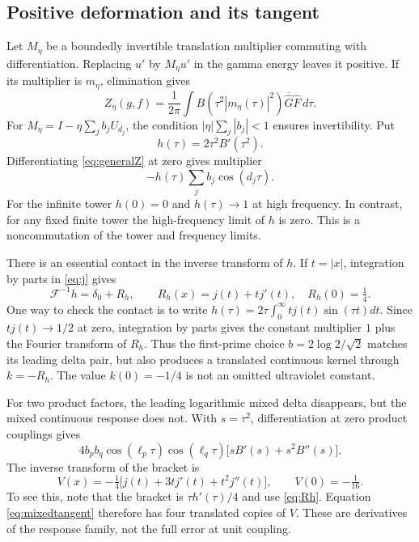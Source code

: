 \documentclass[11pt]{article}
\numberwithin{equation}{section}
\theoremstyle{definition}
\theoremstyle{remark}
\begin{document}
\subsection{Positive deformation and its tangent}
Let $M_\eta$ be a boundedly invertible translation multiplier commuting with differentiation. Replacing $u'$ by $M_\eta u'$ in the gamma energy leaves it positive. If its multiplier is $m_\eta$, elimination gives
\begin{equation}
 Z_\eta(g,f)=\frac1{2\pi}\int B(\tau^2|m_\eta(\tau)|^2)
 \overline{\widehat G}\widehat F\,d\tau.
 \label{eq:generalZ}
\end{equation}
For $M_\eta=I-\eta\sum_j b_jU_{d_j}$, the condition $|\eta|\sum_j|b_j|<1$ ensures invertibility. Put
\begin{equation}
 h(\tau)=2\tau^2B'(\tau^2).
\end{equation}
Differentiating \eqref{eq:generalZ} at zero gives multiplier
\begin{equation}
 -h(\tau)\sum_j b_j\cos(d_j\tau).
 \label{eq:tangent}
\end{equation}
For the infinite tower $h(0)=0$ and $h(\tau)\to1$ at high frequency. In contrast, for any fixed finite tower the high-frequency limit of $h$ is zero. This is a noncommutation of the tower and frequency limits.

There is an essential contact in the inverse transform of $h$. If $t=|x|$, integration by parts in \eqref{eq:j} gives
\begin{equation}
 \mathcal F^{-1}h=\delta_0+R_h,
 \qquad R_h(x)=j(t)+tj'(t),\quad R_h(0)=\tfrac14.
 \label{eq:Rh}
\end{equation}
One way to check the contact is to write $h(\tau)=2\tau\int_0^\infty tj(t)\sin(\tau t)dt$. Since $tj(t)\to1/2$ at zero, integration by parts gives the constant multiplier $1$ plus the Fourier transform of $R_h$. Thus the first-prime choice $b=2\log2/\sqrt2$ matches its leading delta pair, but also produces a translated continuous kernel through $k=-R_h$. The value $k(0)=-1/4$ is not an omitted ultraviolet constant.

For two product factors, the leading logarithmic mixed delta disappears, but the mixed continuous response does not. With $s=\tau^2$, differentiation at zero product couplings gives
\begin{equation}
 4b_pb_q\cos(\ell_p\tau)\cos(\ell_q\tau)
 \bigl[sB'(s)+s^2B''(s)\bigr].
 \label{eq:mixedtangent}
\end{equation}
The inverse transform of the bracket is
\begin{equation}
 V(x)=-\tfrac14\bigl[j(t)+3tj'(t)+t^2j''(t)\bigr],
 \qquad V(0)=-\tfrac1{16}.
\end{equation}
To see this, note that the bracket is $\tau h'(\tau)/4$ and use \eqref{eq:Rh}. Equation \eqref{eq:mixedtangent} therefore has four translated copies of $V$. These are derivatives of the response family, not the full error at unit coupling.
\end{document}
